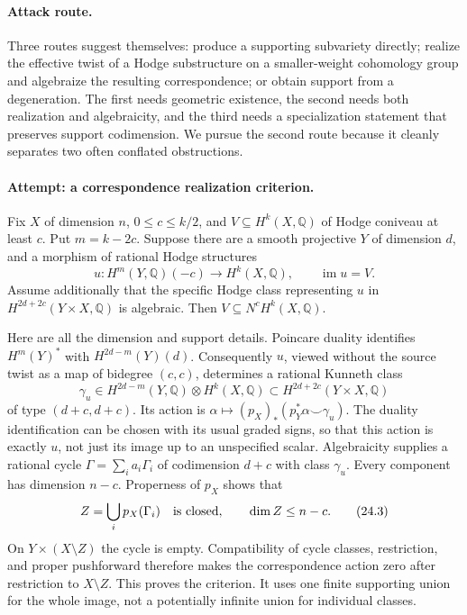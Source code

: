 \documentclass[11pt,a4paper]{article}
\newcommand{\Q}{\mathbb{Q}}
\begin{document}
\paragraph{Attack route.}
Three routes suggest themselves: produce a supporting subvariety directly;
realize the effective twist of a Hodge substructure on a smaller-weight
cohomology group and algebraize the resulting correspondence; or obtain
support from a degeneration. The first needs geometric existence, the
second needs both realization and algebraicity, and the third needs a
specialization statement that preserves support codimension. We pursue the
second route because it cleanly separates two often conflated obstructions.

\paragraph{Attempt: a correspondence realization criterion.}
Fix $X$ of dimension $n$, $0\leq c\leq k/2$, and
$V\subseteq H^k(X,\Q)$ of Hodge coniveau at least $c$. Put $m=k-2c$.
Suppose there are a smooth projective $Y$ of dimension $d$, and a morphism
of rational Hodge structures
\[
 u:H^m(Y,\Q)(-c)\longrightarrow H^k(X,\Q),\qquad \operatorname{im}u=V.
 \tag{24.1}
\]
Assume additionally that the specific Hodge class representing $u$ in
$H^{2d+2c}(Y\times X,\Q)$ is algebraic. Then $V\subseteq N^cH^k(X,\Q)$.

Here are all the dimension and support details. Poincare duality identifies
$H^m(Y)^*$ with $H^{2d-m}(Y)(d)$. Consequently $u$, viewed without the
source twist as a map of bidegree $(c,c)$, determines a rational Kunneth
class
\[
 \gamma_u\in H^{2d-m}(Y,\Q)\otimes H^k(X,\Q)
       \subset H^{2d+2c}(Y\times X,\Q)
 \tag{24.2}
\]
of type $(d+c,d+c)$. Its action is
$\alpha\mapsto (p_X)_*(p_Y^*\alpha\smile\gamma_u)$.
The duality identification can be chosen with its usual graded signs, so
that this action is exactly $u$, not just its image up to an unspecified
scalar. Algebraicity supplies a rational cycle
$\Gamma=\sum_i a_i\Gamma_i$ of codimension $d+c$ with class $\gamma_u$.
Every component has dimension $n-c$. Properness of $p_X$ shows that
\[
 Z=\bigcup_i p_X(\Gamma_i)\quad\hbox{is closed},\qquad
 \dim Z\leq n-c.
 \tag{24.3}
\]
On $Y\times(X\setminus Z)$ the cycle is empty. Compatibility of cycle
classes, restriction, and proper pushforward therefore makes the
correspondence action zero after restriction to $X\setminus Z$.
This proves the criterion. It uses one finite supporting union for the
whole image, not a potentially infinite union for individual classes.
\end{document}
